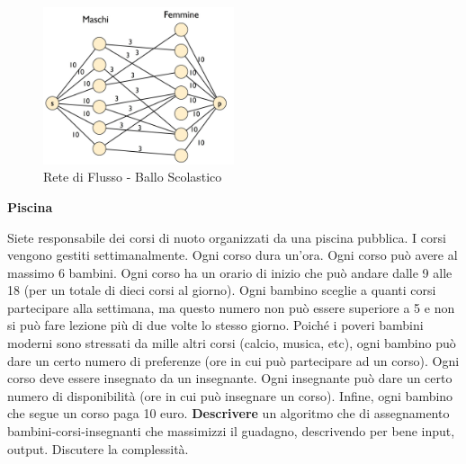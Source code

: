 \documentclass[../cheatSheetAlgoritmi.tex]{subfiles}
\begin{document}
\begin{figure}[h]
\caption{Rete di Flusso - Ballo Scolastico}
\centering
\includegraphics[width=0.5\textwidth]{../img/Locale_4.jpg}
\end{figure}
\newpage
\begin{flushleft}
\textbf{Piscina}
\end{flushleft}
Siete responsabile dei corsi di nuoto organizzati da una piscina pubblica. I corsi vengono gestiti settimanalmente. Ogni corso dura un'ora. Ogni corso può avere al massimo 6 bambini. Ogni corso ha un orario di inizio che può andare dalle 9 alle 18 (per un totale di dieci corsi al giorno). Ogni bambino sceglie a quanti corsi partecipare alla settimana, ma questo numero non può essere superiore a 5 e non si può fare lezione più di due volte lo stesso giorno. Poiché i poveri bambini moderni sono stressati da mille altri corsi (calcio, musica, etc), ogni bambino può dare un certo numero di preferenze (ore in cui può partecipare ad un corso). Ogni corso deve essere insegnato da un insegnante. Ogni insegnante può dare un certo numero di disponibilità (ore in cui può insegnare un corso). Infine, ogni bambino che segue un corso paga 10 euro. \textbf{Descrivere} un algoritmo che di assegnamento bambini-corsi-insegnanti che massimizzi il guadagno, descrivendo per bene input, output. Discutere la complessità.
\end{document}
